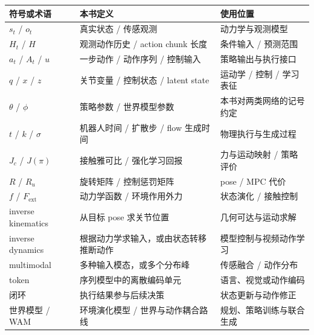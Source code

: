 \documentclass[UTF8,a4paper,11pt,oneside,openany,fontset=none]{ctexbook}
\begin{document}
{\small %
\begin{longtable}[]{@{}
  >{\raggedright\arraybackslash}p{}
  >{\raggedright\arraybackslash}p{}
  >{\raggedright\arraybackslash}p{}@{}}
\toprule\noalign{}
\begin{minipage}[b]{\linewidth}\raggedright
符号或术语
\end{minipage} & \begin{minipage}[b]{\linewidth}\raggedright
本书定义
\end{minipage} & \begin{minipage}[b]{\linewidth}\raggedright
使用位置
\end{minipage} \\
\midrule\noalign{}
\endhead
\bottomrule\noalign{}
\endlastfoot
\(s_{t}\) / \(o_{t}\) & 真实状态 / 传感观测 & 动力学与观测模型 \\
\(H_{t}\) / \(H\) & 观测动作历史 / action chunk 长度 & 条件输入 / 预测范围 \\
\(a_{t}\) / \(A_{t}\) / \(u\) & 一步动作 / 动作序列 / 控制输入 & 策略输出与执行接口 \\
\(q\) / \(x\) / \(z\) & 关节变量 / 控制状态 / latent state & 运动学 / 控制 / 学习表征 \\
\(\theta\) / \(\phi\) & 策略参数 / 世界模型参数 & 本书对两类网络的记号约定 \\
\(t\) / \(k\) / \(\sigma\) & 机器人时间 / 扩散步 / flow 生成时间 & 物理执行与生成过程 \\
\(J_{c}\) / \(J(\pi)\) & 接触雅可比 / 强化学习回报 & 力与运动映射 / 策略评价 \\
\(R\) / \(R_{u}\) & 旋转矩阵 / 控制惩罚矩阵 & pose / MPC 代价 \\
\(f\) / \(F_{\mathrm{ext}}\) & 动力学函数 / 环境作用外力 & 状态演化 / 接触控制 \\
inverse kinematics & 从目标 pose 求关节位置 & 几何可达与运动求解 \\
inverse dynamics & 根据动力学求输入，或由状态转移推断动作 & 模型控制与视频动作学习 \\
multimodal & 多种输入模态，或多个分布峰 & 传感融合 / 动作分布 \\
token & 序列模型中的离散编码单元 & 语言、视觉或动作编码 \\
闭环 & 执行结果参与后续决策 & 状态更新与动作修正 \\
世界模型 / WAM & 环境演化模型 / 世界与动作耦合路线 & 规划、策略训练与联合生成 \\
\end{longtable}
}
\end{document}
